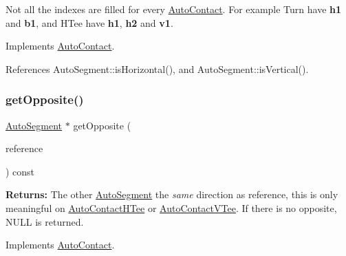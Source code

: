 Not all the indexes are filled for every \mbox{\hyperlink{classKatabatic_1_1AutoContact}{Auto\+Contact}}. For example {\ttfamily Turn} have {\bfseries h1} and {\bfseries b1}, and {\ttfamily H\+Tee} have {\bfseries h1}, {\bfseries h2} and {\bfseries v1}. 

Implements \mbox{\hyperlink{classKatabatic_1_1AutoContact_a50531ded68cc5206fe104b8d8bf3bd87}{Auto\+Contact}}.



References Auto\+Segment\+::is\+Horizontal(), and Auto\+Segment\+::is\+Vertical().

\mbox{\label{classKatabatic_1_1AutoContactTerminal_ac9c9b04e245a1109e297510a3968b7ac}} 
\subsubsection{\texorpdfstring{get\+Opposite()}{getOpposite()}}
{\footnotesize\ttfamily \mbox{\hyperlink{classKatabatic_1_1AutoSegment}{Auto\+Segment}} $\ast$ get\+Opposite (\begin{DoxyParamCaption}\item[{const \mbox{\hyperlink{classKatabatic_1_1AutoSegment}{Auto\+Segment}} $\ast$}]{reference }\end{DoxyParamCaption}) const\hspace{0.3cm}{\ttfamily [virtual]}}

{\bfseries Returns\+:} The other \mbox{\hyperlink{classKatabatic_1_1AutoSegment}{Auto\+Segment}} the {\itshape same} direction as {\ttfamily reference}, this is only meaningful on \mbox{\hyperlink{classKatabatic_1_1AutoContactHTee}{Auto\+Contact\+H\+Tee}} or \mbox{\hyperlink{classKatabatic_1_1AutoContactVTee}{Auto\+Contact\+V\+Tee}}. If there is no opposite, {\ttfamily N\+U\+LL} is returned. 

Implements \mbox{\hyperlink{classKatabatic_1_1AutoContact_a48ab1d3bdf85712e4784ef83ef136939}{Auto\+Contact}}.

\mbox{\label{classKatabatic_1_1AutoContactTerminal_ad99dd549214e43b6509fd8e3aefae919}} 
